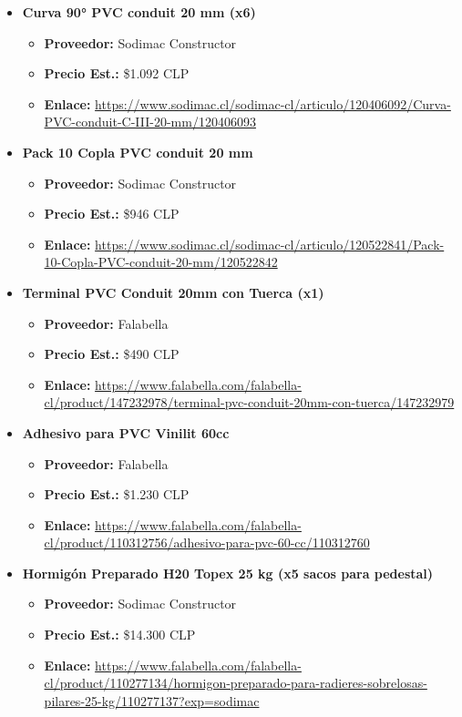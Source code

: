 \begin{itemize}
    \item \textbf{Curva 90° PVC conduit 20 mm (x6)}
    \begin{itemize}
        \item \textbf{Proveedor:} Sodimac Constructor
        \item \textbf{Precio Est.:} \$1.092 CLP
        \item \textbf{Enlace:} \url{https://www.sodimac.cl/sodimac-cl/articulo/120406092/Curva-PVC-conduit-C-III-20-mm/120406093}
    \end{itemize}
    
    \item \textbf{Pack 10 Copla PVC conduit 20 mm}
    \begin{itemize}
        \item \textbf{Proveedor:} Sodimac Constructor
        \item \textbf{Precio Est.:} \$946 CLP
        \item \textbf{Enlace:} \url{https://www.sodimac.cl/sodimac-cl/articulo/120522841/Pack-10-Copla-PVC-conduit-20-mm/120522842}
    \end{itemize}

    \item \textbf{Terminal PVC Conduit 20mm con Tuerca (x1)}
    \begin{itemize}
        \item \textbf{Proveedor:} Falabella
        \item \textbf{Precio Est.:} \$490 CLP
        \item \textbf{Enlace:} \url{https://www.falabella.com/falabella-cl/product/147232978/terminal-pvc-conduit-20mm-con-tuerca/147232979}
    \end{itemize}
    
    \item \textbf{Adhesivo para PVC Vinilit 60cc}
    \begin{itemize}
        \item \textbf{Proveedor:} Falabella
        \item \textbf{Precio Est.:} \$1.230 CLP
        \item \textbf{Enlace:} \url{https://www.falabella.com/falabella-cl/product/110312756/adhesivo-para-pvc-60-cc/110312760}
    \end{itemize}

    \item \textbf{Hormigón Preparado H20 Topex 25 kg (x5 sacos para pedestal)}
    \begin{itemize}
        \item \textbf{Proveedor:} Sodimac Constructor
        \item \textbf{Precio Est.:} \$14.300 CLP
        \item \textbf{Enlace:} \url{https://www.falabella.com/falabella-cl/product/110277134/hormigon-preparado-para-radieres-sobrelosas-pilares-25-kg/110277137?exp=sodimac}
    \end{itemize}
\end{itemize}

